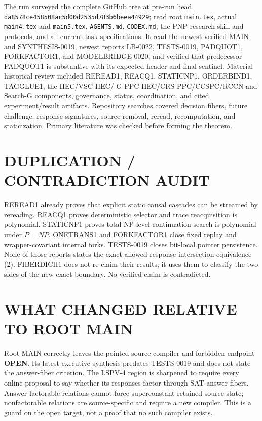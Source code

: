 \documentclass[11pt]{article}
\newcommand{\OPEN}{\textbf{OPEN}}
\begin{document}
The run surveyed the complete GitHub tree at pre-run head
\texttt{da8578ce458508ac5d00d2535d783b6beea44929}; read root
\texttt{main.tex}, actual \texttt{main4.tex} and \texttt{main5.tex},
\texttt{AGENTS.md}, \texttt{CODEX.md}, the PNP research skill and protocols,
and all current task specifications.  It read the newest verified MAIN and
SYNTHESIS-0019, newest reports LB-0022, TESTS-0019, PADQUOT1, FORKFACTOR1,
and MODELBRIDGE-0020, and verified that predecessor PADQUOT1 is substantive
with its expected header and final sentinel.  Material historical review
included REREAD1, REACQ1, STATICNP1, ORDERBIND1, TAGGLUE1, the HEC/VSC-HEC/
G-PPC-HEC/CRS-PPC/CCSPC/RCCN and Search-G components, governance, status,
coordination, and cited experiment/result artifacts.  Repository searches
covered decision fibers, future challenge, response signatures, source
removal, reread, recomputation, and staticization.  Primary literature was
checked before forming the theorem.

\section{DUPLICATION / CONTRADICTION AUDIT}

REREAD1 already proves that explicit static causal cascades can be streamed by
rereading.  REACQ1 proves deterministic selector and trace reacquisition is
polynomial.  STATICNP1 proves total NP-level continuation search is polynomial
under $P=NP$.  ONETRANS1 and FORKFACTOR1 close fixed replay and
wrapper-covariant internal forks.  TESTS-0019 closes bit-local pointer
persistence.  None of those reports states the exact allowed-response
intersection equivalence (2).  FIBERDICH1 does not re-claim their results; it
uses them to classify the two sides of the new exact boundary.  No verified
claim is contradicted.

\section{WHAT CHANGED RELATIVE TO ROOT MAIN}

Root MAIN correctly leaves the pointed source compiler and forbidden endpoint
\OPEN.  Its latest executive synthesis predates TESTS-0019 and does not state
the answer-fiber criterion.  The LSPV-4 region is sharpened to require every
online proposal to say whether its responses factor through SAT-answer
fibers.  Answer-factorable relations cannot force superconstant retained
source state; nonfactorable relations are source-specific and require a new
compiler.  This is a guard on the open target, not a proof that no such
compiler exists.
\end{document}
